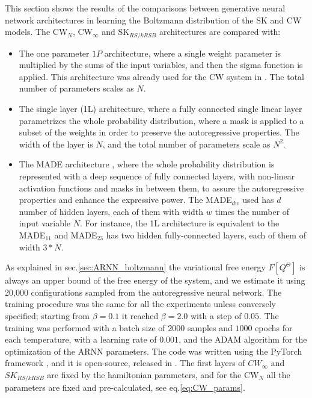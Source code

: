 \documentclass[aps,physrev,10pt,floatfix,reprint]{revtex4-2}
\begin{document}
This section shows the results of the comparisons between generative neural network architectures in learning the Boltzmann distribution of the SK and CW models. 
The CW$_N$, CW$_{\infty}$ and SK$_{RS/kRSB}$ architectures are compared with: 
\begin{itemize}
    \item The one parameter $1P$ architecture, where a single weight parameter is multiplied by the sums of the input variables, and then the sigma function is applied. This architecture was already used for the CW system in \cite{https://doi.org/10.48550/arxiv.2210.11145}. The total number of parameters scales as $N$.
    \item The single layer (1L) architecture, where a fully connected single linear layer parametrizes the whole probability distribution, where a mask is applied to a subset of the weights in order to preserve the autoregressive properties. The width of the layer is $N$, and the total number of parameters scale as $N^2$.
    \item The MADE architecture \cite{pmlr-v37-germain15}, where the whole probability distribution is represented with a deep sequence of fully connected layers, with non-linear activation functions and masks in between them, to assure the autoregressive properties and enhance the expressive power. The MADE$_{dw}$ used has $d$ number of hidden layers, each of them with width $w$ times the number of input variable $N$. For instance, the 1L architecture is equivalent to the MADE$_{11}$ and MADE$_{23}$ has two hidden fully-connected layers, each of them of width $3*N$. 
\end{itemize}
As explained in sec.\ref{sec:ARNN_boltzmann} the variational free energy $F[Q^{\Theta}]$ is always an upper bound of the free energy of the system, and we estimate it using 20,000 configurations sampled from the autoregressive neural network.
The training procedure was the same for all the experiments unless conversely specified; starting from $\beta=0.1$ it reached $\beta=2.0$ with a step of $0.05$. The training was performed with a batch size of $2000$ samples and $1000$ epochs for each temperature, with a learning rate of $0.001$, and the ADAM algorithm for the optimization of the ARNN parameters. The code was written using the PyTorch framework \cite{NEURIPS2019_bdbca288}, and it is open-source, released in \cite{mygithub}.
The first layers of $CW_{\infty}$ and $SK_{RS/kRSB}$ are fixed by the hamiltonian parameters, and for the CW$_N$ all the parameters are fixed and pre-calculated, see eq.\ref{eq:CW_params}.
\end{document}
